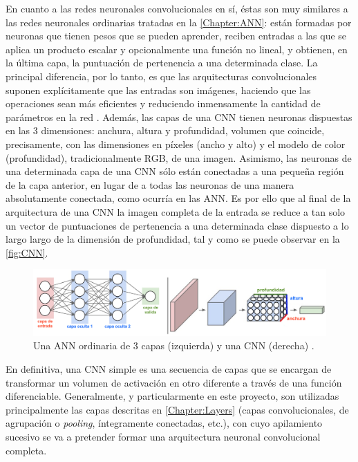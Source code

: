 En cuanto a las redes neuronales convolucionales en sí, éstas son muy similares a las redes neuronales ordinarias tratadas en la \autoref{Chapter:ANN}: están formadas por neuronas que tienen pesos que se pueden aprender, reciben entradas a las que se aplica un producto escalar y opcionalmente una función no lineal, y obtienen, en la última capa, la puntuación de pertenencia a una determinada clase. La principal diferencia, por lo tanto, es que las arquitecturas convolucionales suponen explícitamente que las entradas son imágenes, haciendo que las operaciones sean más eficientes y reduciendo inmensamente la cantidad de parámetros en la red \cite{CS231n}. Además, las capas de una CNN tienen neuronas dispuestas en las 3 dimensiones: anchura, altura y profundidad, volumen que coincide, precisamente, con las dimensiones en píxeles (ancho y alto) y el modelo de color (profundidad), tradicionalmente RGB, de una imagen. Asimismo, las neuronas de una determinada capa de una CNN sólo están conectadas a una pequeña región de la capa anterior, en lugar de a todas las neuronas de una manera absolutamente conectada, como ocurría en las ANN. Es por ello que al final de la arquitectura de una CNN la imagen completa de la entrada se reduce a tan solo un vector de puntuaciones de pertenencia a una determinada clase dispuesto a lo largo largo de la dimensión de profundidad, tal y como se puede observar en la \autoref{fig:CNN}.

\begin{figure}
    \centering
    \includegraphics[width=\textwidth]{Images/CNN.png}
    \caption{Una ANN ordinaria de 3 capas (izquierda) y una CNN (derecha) \cite{CS231n}.}
    \label{fig:CNN}
\end{figure}

En definitiva, una CNN simple es una secuencia de capas que se encargan de transformar un volumen de activación en otro diferente a través de una función diferenciable. Generalmente, y particularmente en este proyecto, son utilizadas principalmente las capas descritas en \autoref{Chapter:Layers} (capas convolucionales, de agrupación o \textit{pooling}, íntegramente conectadas, etc.), con cuyo apilamiento sucesivo se va a pretender formar una arquitectura neuronal convolucional completa.

